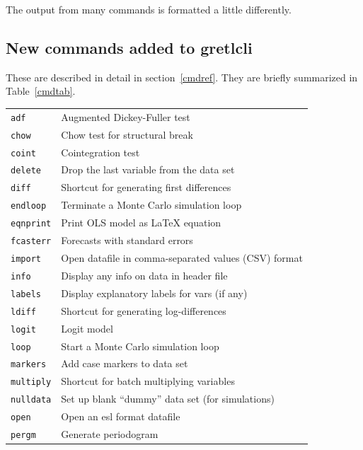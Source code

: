 \documentclass{article}
\begin{document}
The output from many commands is formatted a little differently.

\subsection{New commands added to gretlcli}

These are described in detail in section~\ref{cmdref}.  They are
briefly summarized in Table~\ref{cmdtab}.

\begin{table}[htbp]
\begin{center}
\begin{tabular}{ll}
\texttt{adf} &            Augmented Dickey-Fuller test\\
\texttt{chow} &           Chow test for structural break\\
\texttt{coint} &          Cointegration test\\
\texttt{delete} &         Drop the last variable from the data set\\
\texttt{diff} &           Shortcut for generating first differences\\
\texttt{endloop} &        Terminate a Monte Carlo simulation loop\\
\texttt{eqnprint} &       Print OLS model as \LaTeX{} equation\\
\texttt{fcasterr} &       Forecasts with standard errors\\
\texttt{import} &         Open datafile in comma-separated values (CSV) format\\
\texttt{info} &           Display any info on data in header file  \\           
\texttt{labels} &         Display explanatory labels for vars (if any)\\
\texttt{ldiff} &          Shortcut for generating log-differences\\
\texttt{logit} &          Logit model\\
\texttt{loop} &           Start a Monte Carlo simulation loop\\
\texttt{markers} &        Add case markers to data set\\
\texttt{multiply} &       Shortcut for batch multiplying variables\\
\texttt{nulldata} &       Set up blank ``dummy'' data set (for simulations)\\
\texttt{open} &           Open an esl format datafile\\
\texttt{pergm} &          Generate periodogram\\

\end{tabular}
\end{center}
\end{table}
\end{document}
